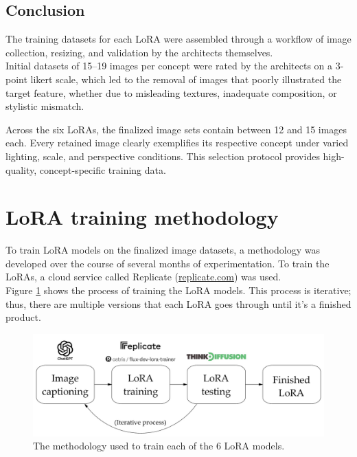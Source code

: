 \subsection{Conclusion}
The training datasets for each LoRA were assembled through a workflow of image collection, resizing, and validation by the architects themselves. \\
Initial datasets of 15–19 images per concept were rated by the architects on a 3-point likert scale, which led to the removal of images that poorly illustrated the target feature, whether due to misleading textures, inadequate composition, or stylistic mismatch.

Across the six LoRAs, the finalized image sets contain between 12 and 15 images each. Every retained image clearly exemplifies its respective concept under varied lighting, scale, and perspective conditions. This selection protocol provides high-quality, concept-specific training data.

\newpage
\section{LoRA training methodology}\label{sec:LoRA training methodology}
To train LoRA models on the finalized image datasets, a methodology was developed over the course of several months of experimentation. To train the LoRAs, a cloud service called Replicate (\href{https://replicate.com/}{replicate.com}) was used.\\
Figure \ref{fig:lora-methodology} shows the process of training the LoRA models. This process is iterative; thus, there are multiple versions that each LoRA goes through until it's a finished product.
\begin{figure}[H]
    \centering
    \includegraphics[width=\linewidth]{Images//Methodology/LoRA methodology.jpg}
    \caption{The methodology used to train each of the 6 LoRA models.}
    \label{fig:lora-methodology}
\end{figure}

